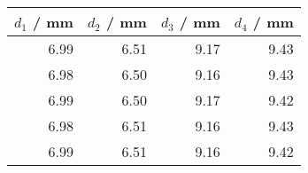\begin{tabular}{rrrr}\\
 $d_1$ / mm & $d_2$ / mm & $d_3$ / mm & $d_4$ / mm  \\
 \hline
6.99 & 6.51 & 9.17 & 9.43\\
6.98 & 6.50 & 9.16 & 9.43\\
6.99 & 6.50 & 9.17 & 9.42\\
6.98 & 6.51 & 9.16 & 9.43\\
6.99 & 6.51 & 9.16 & 9.42
\end{tabular}